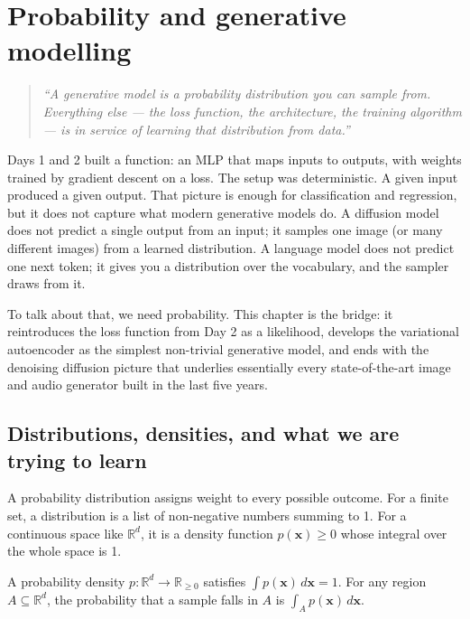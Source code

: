 \chapter{Probability and generative modelling}
\label{ch:day3}

\begin{quote}
\emph{``A generative model is a probability distribution you can sample from. Everything else --- the loss function, the architecture, the training algorithm --- is in service of learning that distribution from data.''}
\end{quote}

Days 1 and 2 built a function: an MLP that maps inputs to outputs, with weights trained by gradient descent on a loss. The setup was deterministic. A given input produced a given output. That picture is enough for classification and regression, but it does not capture what modern generative models do. A diffusion model does not predict a single output from an input; it samples one image (or many different images) from a learned distribution. A language model does not predict one next token; it gives you a distribution over the vocabulary, and the sampler draws from it.

To talk about that, we need probability. This chapter is the bridge: it reintroduces the loss function from Day 2 as a likelihood, develops the variational autoencoder as the simplest non-trivial generative model, and ends with the denoising diffusion picture that underlies essentially every state-of-the-art image and audio generator built in the last five years.

\section{Distributions, densities, and what we are trying to learn}

A probability distribution assigns weight to every possible outcome. For a finite set, a distribution is a list of non-negative numbers summing to 1. For a continuous space like $\mathbb{R}^d$, it is a density function $p(\bm{x}) \geq 0$ whose integral over the whole space is 1.

\begin{definition}[Density]
A probability density $p: \mathbb{R}^d \to \mathbb{R}_{\geq 0}$ satisfies $\int p(\bm{x}) \, d\bm{x} = 1$. For any region $A \subseteq \mathbb{R}^d$, the probability that a sample falls in $A$ is $\int_A p(\bm{x}) \, d\bm{x}$.
\end{definition}

